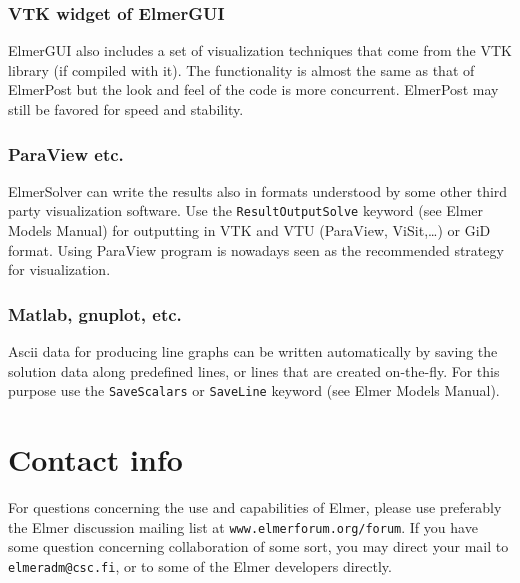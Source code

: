 \subsubsection*{VTK widget of ElmerGUI}
ElmerGUI also includes a set of visualization techniques that come from the VTK library (if compiled with it). 
The functionality is almost the same as that of ElmerPost but the look and feel of the code is more concurrent. 
ElmerPost may still be favored for speed and stability.

\subsubsection*{ParaView etc.}
ElmerSolver can write the results also in formats understood by some other third party visualization 
software. Use the \texttt{ResultOutputSolve} keyword (see Elmer Models Manual) for outputting 
in VTK and VTU (ParaView, ViSit,\ldots ) or GiD format. Using ParaView program
is nowadays seen as the recommended strategy for visualization.

\subsubsection*{Matlab, gnuplot, etc.}
Ascii data for producing line graphs can be written automatically by saving the 
solution data along predefined lines, or lines that are created on-the-fly.
For this purpose use the \texttt{SaveScalars} or \texttt{SaveLine} keyword (see Elmer Models Manual).


\section*{Contact info}

For questions concerning the use and capabilities of Elmer, 
please use preferably the Elmer discussion mailing list at \texttt{www.elmerforum.org/forum}.
If you have some question concerning collaboration of some sort, you may direct your mail to
\texttt{elmeradm@csc.fi}, or to some of the Elmer developers directly. 


